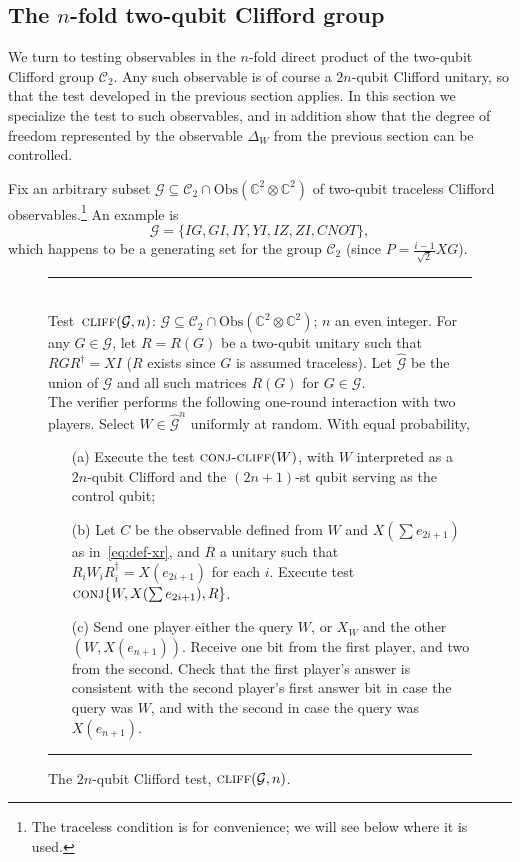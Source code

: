 \documentclass[11pt]{article}
\theoremstyle{remark}
\theoremstyle{definition}
\newcommand{\C}{\ensuremath{\mathbb{C}}}
\newcommand{\setft}[1]{\mathrm{#1}}
\newcommand{\Obs}{\setft{Obs}}
\newcommand{\pbt}{\textsc{pbt}}
\newcommand{\conj}{\textsc{conj}}
\newcommand{\perm}{\textsc{tens}}
\newcommand{\conjc}{\textsc{conj-cliff}}
\newcommand{\cliff}{\textsc{cliff}}
\newcommand{\cliffordgb}{{\mathcal{C}_2}}
\begin{document}
\subsection{The $n$-fold two-qubit Clifford group}
\label{sec:n-2-clifford}

We turn to testing observables in the $n$-fold direct product of the two-qubit Clifford group $\cliffordgb$. Any such observable is of course a $2n$-qubit Clifford unitary, so that the test developed in the previous section applies. In this section we specialize the test to such observables, and in addition show that the degree of freedom represented by the observable $\Delta_W$ from the previous section can be controlled. 

 Fix an arbitrary subset $\mathcal{G} \subseteq \cliffordgb \cap \Obs(\C^2\otimes \C^2)$ of two-qubit traceless Clifford observables.\footnote{The traceless condition is for convenience; we will see below where it is used.} An example is 
$$\mathcal{G} = \{IG,GI,IY,YI,IZ,ZI,CNOT\},$$
 which happens to be a generating set for the group $\cliffordgb$ (since $P = \frac{i-1}{\sqrt{2}} XG$).
 
\begin{figure}[H]
\rule[1ex]{16.5cm}{0.5pt}\\
Test~$\cliff(\mathcal{G},n)$: $\mathcal{G} \subseteq \cliffordgb \cap \Obs(\C^2\otimes \C^2)$; $n$ an even integer.  For any $G\in \mathcal{G}$, let $R=R(G)$ be a two-qubit unitary such that $RGR^\dagger = XI$ ($R$ exists since $G$ is assumed traceless). Let $\hat{\mathcal{G}}$ be the union of $\mathcal{G}$ and all such matrices $R(G)$ for $G\in\mathcal{G}$.\\
The verifier performs the following one-round interaction with two
players. Select $W \in \hat{\mathcal{G}}^n$ uniformly at random. With equal probability,
\begin{enumerate}
\item[(a)] Execute the test $\conjc(W)$, with $W$ interpreted as a $2n$-qubit Clifford and the $(2n+1)$-st qubit serving as the control qubit; 
\item[(b)] Let $C$ be the observable defined from $W$ and $X(\sum e_{2i+1})$ as in~\eqref{eq:def-xr}, and $R$ a unitary such that $R_i W_i R_i^\dagger = X(e_{2i+1})$ for each $i$.
Execute test $\conj\{W, X(\sum e_{2i+1}), R\}$. 
\item[(c)] Send one player either the query $W$, or $X_W$ and the other $(W,X(e_{n+1}))$. Receive one bit from the first player, and two from the second. Check that the first player's answer is consistent with the second player's first answer bit in case the query was $W$, and with the second in case the query was $X(e_{n+1})$. 
\end{enumerate}
\rule[2ex]{16.5cm}{0.5pt}\vspace{-1cm}
\caption{The $2n$-qubit Clifford test, $\cliff(\mathcal{G},n)$.}
\label{fig:clifford-test-3}
\end{figure}
\end{document}
